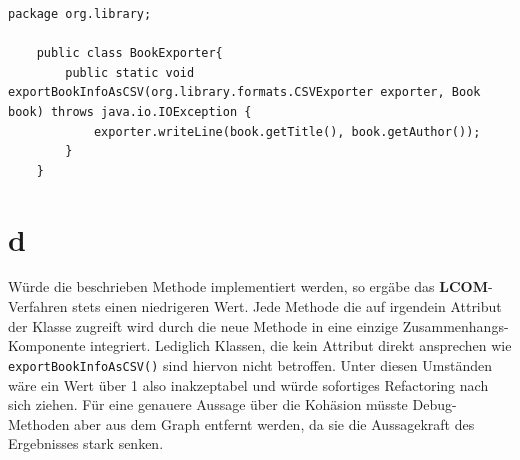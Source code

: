 \begin{lstlisting}[caption = BookExporter]
	package org.library;

	public class BookExporter{
		public static void exportBookInfoAsCSV(org.library.formats.CSVExporter exporter, Book book) throws java.io.IOException {        
			exporter.writeLine(book.getTitle(), book.getAuthor());        
		}   	
	}

\end{lstlisting}
\section*{d} 
Würde die beschrieben Methode implementiert werden, so ergäbe das \textbf{LCOM}-Verfahren stets einen niedrigeren Wert. Jede Methode die auf irgendein Attribut der Klasse zugreift wird durch die neue Methode in eine einzige Zusammenhangs-Komponente integriert.
Lediglich Klassen, die kein Attribut direkt ansprechen wie \texttt{exportBookInfoAsCSV()} sind hiervon nicht betroffen.
Unter diesen Umständen wäre ein Wert über 1 also inakzeptabel und würde sofortiges Refactoring nach sich ziehen. Für eine genauere Aussage über die Kohäsion müsste Debug-Methoden aber aus dem Graph entfernt werden, da sie die Aussagekraft des Ergebnisses stark senken. 


